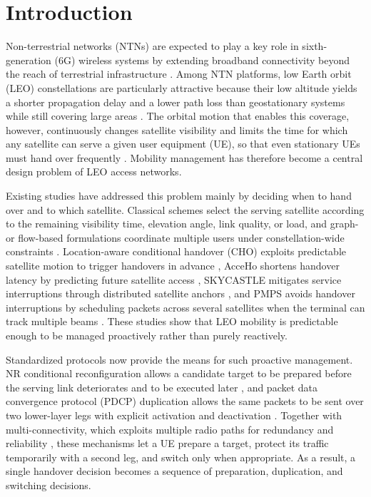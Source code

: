 \documentclass[journal]{IEEEtran}
\begin{document}
\section{Introduction}
\label{sec:introduction}

Non-terrestrial networks (NTNs) are expected to play a key role in
sixth-generation (6G) wireless systems by extending broadband connectivity
beyond the reach of terrestrial infrastructure
\cite{giordani2021ntn,3gpp38811,fontanesi2026aisurvey}. Among NTN platforms,
low Earth orbit (LEO) constellations are particularly attractive because
their low altitude yields a shorter propagation delay and a lower path loss
than geostationary systems while still covering large areas
\cite{giordani2021ntn,juan2022handover}. The orbital motion that enables this
coverage, however, continuously changes satellite visibility and limits the
time for which any satellite can serve a given user equipment (UE), so that
even stationary UEs must hand over frequently
\cite{ji2021mobility,juan2022handover}. Mobility management has therefore
become a central design problem of LEO access networks.

Existing studies have addressed this problem mainly by deciding when to hand
over and to which satellite. Classical schemes select the serving satellite
according to the remaining visibility time, elevation angle, link quality, or
load, and graph- or flow-based formulations coordinate multiple users under
constellation-wide constraints \cite{zhang2021networkflow,juan2022handover}.
Location-aware conditional handover (CHO) exploits predictable satellite
motion to trigger handovers in advance \cite{lee2023locationcho}, AcceHo
shortens handover latency by predicting future satellite access
\cite{wu2024acceho}, SKYCASTLE mitigates service interruptions through
distributed satellite anchors \cite{li2024skycastle}, and PMPS avoids
handover interruptions by scheduling packets across several satellites when
the terminal can track multiple beams \cite{wang2026pmps}. These studies show that
LEO mobility is predictable enough to be managed proactively rather than
purely reactively.

Standardized protocols now provide the means for such proactive management.
NR conditional reconfiguration allows a candidate target to be prepared
before the serving link deteriorates and to be executed later
\cite{3gpp38331}, and packet data convergence protocol (PDCP) duplication
allows the same packets to be sent over two lower-layer legs with explicit
activation and deactivation \cite{3gpp38323}. Together with
multi-connectivity, which exploits multiple radio paths for redundancy and
reliability \cite{pupiales2021mc,lopez2022empiricalmc,3gpp38821}, these
mechanisms let a UE prepare a target, protect its traffic temporarily with a
second leg, and switch only when appropriate. As a result, a single handover
decision becomes a sequence of preparation, duplication, and switching
decisions.
\end{document}
